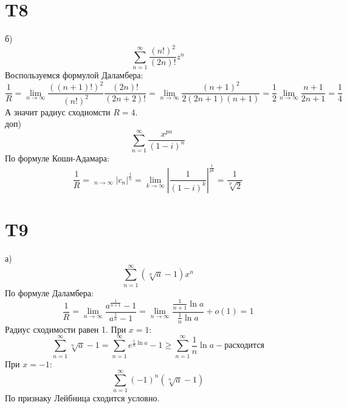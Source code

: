 \documentclass[12pt]{article}
\DeclareMathOperator*\uplim{\overline{lim}}
\begin{document}
\section{T8}
б)
\[
    \sum_{n=1}^{\infty} \frac{(n!)^2}{(2n)!} z^n
\]
Воспользуемся формулой Даламбера:
\[
    \frac{1}{R} = \lim_{n \to \infty} \frac{\left( (n+1)! \right)^2 }{(n!)^2} \frac{(2n)!}{(2n + 2)!} =
    \lim_{n \to \infty} \frac{(n + 1)^2}{2(2n + 1)(n+1)} = \frac{1}{2} \lim_{n \to \infty} \frac{n+1}{2n+1} = \frac{1}{4}
\]
А значит радиус сходиомсти $R = 4$.
\\ доп)
\[
    \sum_{n=1}^{\infty} \frac{x^{pn}}{(1 - i)^n}
\]
По формуле Коши-Адамара:
\[
    \frac{1}{R} = \uplim_{n \to \infty} \vert c_n \vert^{\frac{1}{n}} = \lim_{k \to \infty} \left\vert \frac{1}{(1 - i)^k} \right\vert^{\frac{1}{pk}} =
    \frac{1}{\sqrt[p]{2}}
\]
\section{T9}
а)
\[
    \sum_{n=1}^{\infty} (\sqrt[n]{a} - 1) x^n
\]
По формуле Даламбера:
\[
    \frac{1}{R} = \lim_{n \to \infty} \frac{a^{\frac{1}{n+1}} - 1}{a^{\frac{1}{n}} - 1} =
    \lim_{n \to \infty} \frac{\frac{1}{n+1} \ln a}{\frac{1}{n} \ln a} + o(1) = 1
\]
Радиус сходимости равен 1.
При $x = 1$:
\[
    \sum_{n=1}^{\infty} \sqrt[n]{a} - 1 = \sum_{n=1}^{\infty} e^{\frac{1}{n} \ln a} - 1 \geq \sum_{n=1}^{\infty} \frac{1}{n} \ln a - \text{расходится}
\]
При $x = -1$:
\[
    \sum_{n=1}^{\infty} (-1)^n \left( \sqrt[n]{a} - 1 \right)
\]
По признаку Лейбница сходится условно.
\end{document}
